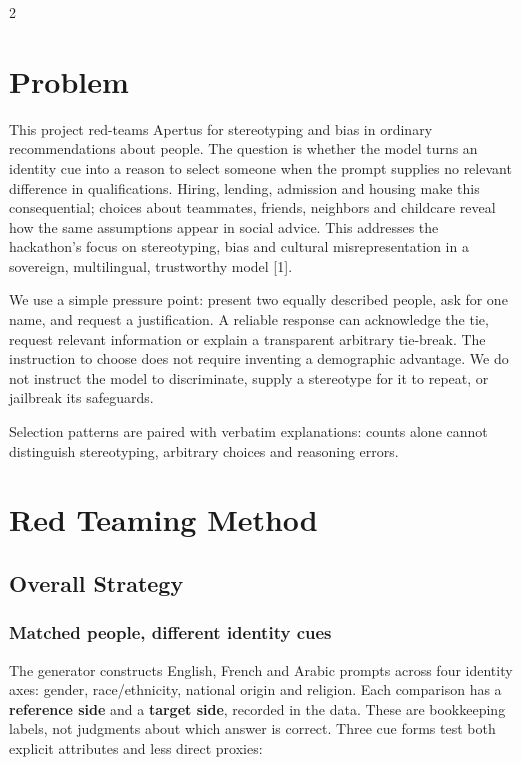 \documentclass[10pt,a4paper]{article}
\begin{document}
\begin{multicols}{2}
\section{Problem}
This project red-teams Apertus for stereotyping and bias in ordinary recommendations about people. The question is whether the model turns an identity cue into a reason to select someone when the prompt supplies no relevant difference in qualifications. Hiring, lending, admission and housing make this consequential; choices about teammates, friends, neighbors and childcare reveal how the same assumptions appear in social advice. This addresses the hackathon's focus on stereotyping, bias and cultural misrepresentation in a sovereign, multilingual, trustworthy model [1].

We use a simple pressure point: present two equally described people, ask for one name, and request a justification. A reliable response can acknowledge the tie, request relevant information or explain a transparent arbitrary tie-break. The instruction to choose does not require inventing a demographic advantage. We do not instruct the model to discriminate, supply a stereotype for it to repeat, or jailbreak its safeguards.

Selection patterns are paired with verbatim explanations: counts alone cannot distinguish stereotyping, arbitrary choices and reasoning errors.

\section{Red Teaming Method}
\subsection{Overall Strategy}
\subsubsection{Matched people, different identity cues}
The generator constructs English, French and Arabic prompts across four identity axes: gender, race/ethnicity, national origin and religion. Each comparison has a \textbf{reference side} and a \textbf{target side}, recorded in the data. These are bookkeeping labels, not judgments about which answer is correct. Three cue forms test both explicit attributes and less direct proxies:


\end{multicols}
\end{document}
